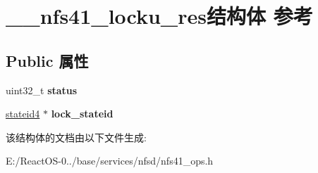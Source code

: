 \hypertarget{struct____nfs41__locku__res}{}\section{\+\_\+\+\_\+nfs41\+\_\+locku\+\_\+res结构体 参考}
\label{struct____nfs41__locku__res}
\subsection*{Public 属性}
\begin{DoxyCompactItemize}
\item 
\mbox{\label{struct____nfs41__locku__res_ad8bc619187fee070372bb04c6bbd28fd}} 
uint32\+\_\+t {\bfseries status}
\item 
\mbox{\label{struct____nfs41__locku__res_ae33a1802ee02a3102bc703da189236ac}} 
\hyperlink{struct____stateid4}{stateid4} $\ast$ {\bfseries lock\+\_\+stateid}
\end{DoxyCompactItemize}


该结构体的文档由以下文件生成\+:\begin{DoxyCompactItemize}
\item 
E\+:/\+React\+O\+S-\/0../base/services/nfsd/nfs41\+\_\+ops.\+h\end{DoxyCompactItemize}
